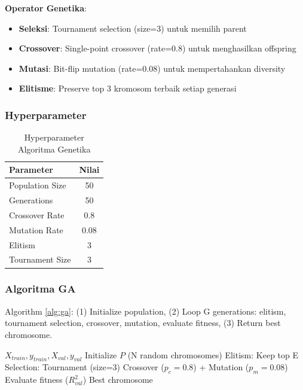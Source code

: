 \documentclass[conference]{IEEEtran}
\begin{document}
\textbf{Operator Genetika}:
\begin{itemize}
    \item \textbf{Seleksi}: Tournament selection (size=3) untuk memilih parent
    \item \textbf{Crossover}: Single-point crossover (rate=0.8) untuk menghasilkan offspring
    \item \textbf{Mutasi}: Bit-flip mutation (rate=0.08) untuk mempertahankan diversity
    \item \textbf{Elitisme}: Preserve top 3 kromosom terbaik setiap generasi
\end{itemize}

\subsubsection{Hyperparameter}

\begin{table}[htbp]
\caption{Hyperparameter Algoritma Genetika}
\begin{center}
\begin{tabular}{|l|c|}
\hline
\textbf{Parameter} & \textbf{Nilai} \\
\hline
Population Size & 50 \\
Generations & 50 \\
Crossover Rate & 0.8 \\
Mutation Rate & 0.08 \\
Elitism & 3 \\
Tournament Size & 3 \\
\hline
\end{tabular}
\label{tab:ga_params}
\end{center}
\end{table}

\subsubsection{Algoritma GA}
Algorithm \ref{alg:ga}: (1) Initialize population, (2) Loop G generations: elitism, tournament selection, crossover, mutation, evaluate fitness, (3) Return best chromosome.

\begin{algorithm}[htbp]
\caption{GA untuk Feature Selection}
\label{alg:ga}
\begin{algorithmic}[1]
\REQUIRE $X_{train}, y_{train}, X_{val}, y_{val}$
\STATE Initialize $P$ (N random chromosomes)
    \STATE Elitism: Keep top E
    \STATE Selection: Tournament (size=3)
    \STATE Crossover ($p_c=0.8$) + Mutation ($p_m=0.08$)
    \STATE Evaluate fitness ($R^2_{val}$)
\ENDFOR
\RETURN Best chromosome
\end{algorithmic}
\end{algorithm}
\end{document}

